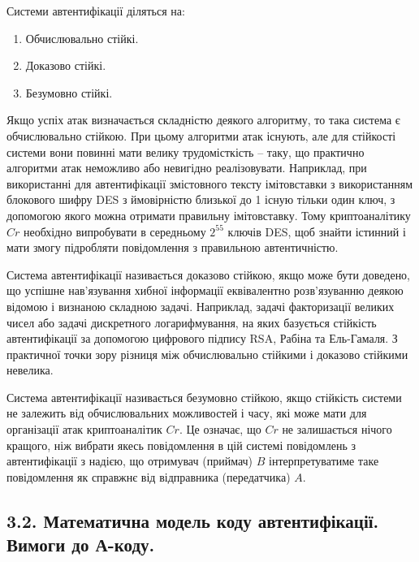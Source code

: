 Системи автентифікації діляться на:
\begin{enumerate}
    \item Обчислювально стійкі.
    \item Доказово стійкі.
    \item Безумовно стійкі.
\end{enumerate}

Якщо успіх атак визначається складністю деякого алгоритму, то така
система є обчислювально стійкою. При цьому алгоритми атак існують, але для
стійкості системи вони повинні мати велику трудомісткість -- таку, що
практично алгоритми атак неможливо або невигідно реалізовувати.
Наприклад, при використанні для автентифікації змістовного тексту
імітовставки з використанням блокового шифру DES з ймовірністю близької
до 1 існую тільки один ключ, з допомогою якого можна отримати правильну
імітовставку. Тому криптоаналітику $Cr$ необхідно випробувати в середньому
$2^{55}$ ключів DES, щоб знайти істинний і мати змогу підробляти повідомлення з
правильною автентичністю.

Система автентифікації називається доказово стійкою, якщо може бути
доведено, що успішне нав’язування хибної інформації еквівалентно
розв’язуванню деякою відомою і визнаною складною задачі. Наприклад,
задачі факторизації великих чисел або задачі дискретного логарифмування, на
яких базується стійкість автентифікації за допомогою цифрового підпису
RSA, Рабіна та Ель-Гамаля. З практичної точки зору різниця між
обчислювально стійкими і доказово стійкими невелика.

Система автентифікації називається безумовно стійкою, якщо стійкість
системи не залежить від обчислювальних можливостей і часу, які може мати
для організації атак криптоаналітик $Cr$. Це означає, що $Cr$ не залишається
нічого кращого, ніж вибрати якесь повідомлення в цій системі повідомлень з
автентифікації з надією, що отримувач (приймач) $B$ інтерпретуватиме таке
повідомлення як справжнє від відправника (передатчика) $A$.

\subsection{3.2. Математична модель коду автентифікації. Вимоги до А-коду.}


